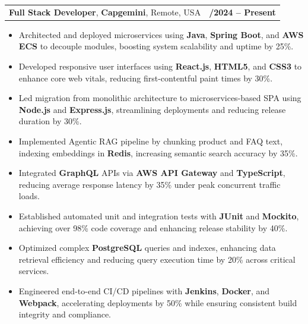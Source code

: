 \documentclass[letterpaper,11pt]{article}
\makeatletter
\newcommand{\resumeItem}[1]{
  \item\footnotesize{
    {#1 \vspace{-2pt}}
  }
}
\newcommand{\resumeSubheading}[4]{
  \vspace{-2pt}\item
    \begin{tabular*}{1.0\textwidth}[t]{l@{\extracolsep{\fill}}r}
      \textbf{\fontsize{10pt}{14pt}\selectfont #3}, \textbf{\fontsize{10pt}{14pt}\selectfont #1}, \fontsize{10pt}{14pt}\selectfont #4 & \textbf{\fontsize{10pt}{14pt}\selectfont #2} \\
    \end{tabular*}\vspace{-7pt}
}
\newcommand{\resumeItemListStart}{\begin{itemize}[leftmargin=*]}
\newcommand{\resumeItemListEnd}{\end{itemize}\vspace{-5pt}}
\makeatother
\begin{document}
    \resumeSubheading
        {Capgemini}{01/2024 -- Present}
        {Full Stack Developer}{Remote, USA}
      \resumeItemListStart
        \resumeItem{Architected and deployed microservices using \textbf{Java}, \textbf{Spring Boot}, and \textbf{AWS ECS} to decouple modules, boosting system scalability and uptime by 25\%.}
        \resumeItem{Developed responsive user interfaces using \textbf{React.js}, \textbf{HTML5}, and \textbf{CSS3} to enhance core web vitals, reducing first-contentful paint times by 30\%.}
        \resumeItem{Led migration from monolithic architecture to microservices-based SPA using \textbf{Node.js} and \textbf{Express.js}, streamlining deployments and reducing release duration by 30\%.}
        \resumeItem{Implemented Agentic RAG pipeline by chunking product and FAQ text, indexing embeddings in \textbf{Redis}, increasing semantic search accuracy by 35\%.}
        \resumeItem{Integrated \textbf{GraphQL} APIs via \textbf{AWS API Gateway} and \textbf{TypeScript}, reducing average response latency by 35\% under peak concurrent traffic loads.}
        \resumeItem{Established automated unit and integration tests with \textbf{JUnit} and \textbf{Mockito}, achieving over 98\% code coverage and enhancing release stability by 40\%.}
        \resumeItem{Optimized complex \textbf{PostgreSQL} queries and indexes, enhancing data retrieval efficiency and reducing query execution time by 20\% across critical services.}
        \resumeItem{Engineered end-to-end CI/CD pipelines with \textbf{Jenkins}, \textbf{Docker}, and \textbf{Webpack}, accelerating deployments by 50\% while ensuring consistent build integrity and compliance.}
      \resumeItemListEnd
\end{document}

